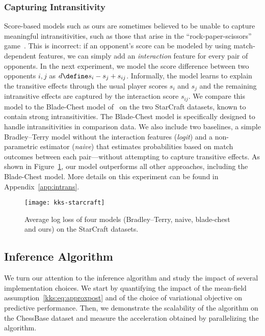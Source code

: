 \subsubsection{Capturing Intransitivity} \label{kks:sec:eval-intrans}
Score-based models such as ours are sometimes believed to be unable to capture meaningful intransitivities, such as those that arise in the ``rock-paper-scissors'' game~\citep{chen2016modeling}.
This is incorrect: if an opponent's score can be modeled by using match-dependent features, we can simply add an \emph{interaction} feature for every pair of opponents.
In the next experiment, we model the score difference between two opponents $i, j$ as $d \define s_i - s_j + s_{ij}$.
Informally, the model learns to explain the transitive effects through the usual player scores $s_i$ and $s_j$ and the remaining intransitive effects are captured by the interaction score $s_{ij}$.
We compare this model to the Blade-Chest model of~\citet{chen2016modeling} on the two StarCraft datasets, known to contain strong intransitivities.
The Blade-Chest model is specifically designed to handle intransitivities in comparison data.
We also include two baselines, a simple Bradley--Terry model without the interaction features (\emph{logit}) and a non-parametric estimator (\emph{naive}) that estimates probabilities based on match outcomes between each pair---without attempting to capture transitive effects.
As shown in Figure~\ref{kks:fig:starcraft}, our model outperforms all other approaches, including the Blade-Chest model.
More details on this experiment can be found in Appendix~\ref{app:intrans}.

\begin{figure}[t]
	\texttt{[image: kks-starcraft]}
	\caption{
		Average log loss of four models (Bradley--Terry, naive, blade-chest and ours) on the StarCraft datasets.}
	\label{kks:fig:starcraft}
\end{figure}


\subsection{Inference Algorithm}
\label{kks:sec:evalinf}
We turn our attention to the inference algorithm and study the impact of several implementation choices.
We start by quantifying the impact of the mean-field assumption~\eqref{kks:eq:approxpost} and of the choice of variational objective on predictive performance.
Then, we demonstrate the scalability of the algorithm on the ChessBase dataset and measure the acceleration obtained by parallelizing the algorithm.


